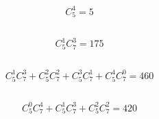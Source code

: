 \documentclass{article}
\begin{document}
    \section{}
        \subsection{}
            \paragraph{
                $$C_5^4=5$$
            }
        \subsection{}
            \paragraph{
                $$C_5^1C_7^3=175$$
            }
        \subsection{}
            \paragraph{
                $$C_5^1C_7^3+C_5^2C_7^2+C_5^3C_7^1+C_5^4C_7^0=460$$
            }
        \subsection{}
            \paragraph{
                $$C_5^0C_7^4+C_5^1C_7^3+C_5^2C_7^2=420$$
            }
\end{document}
